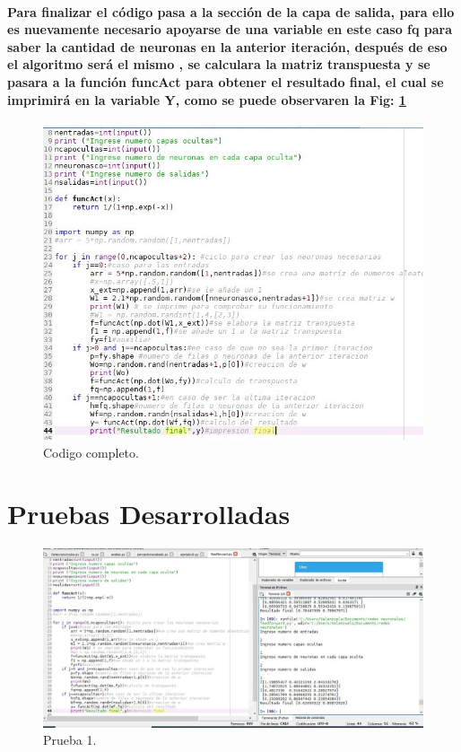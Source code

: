 \documentclass[10pt,a4paper]{article}
\begin{document}
\paragraph{Para finalizar el c\'odigo pasa a la secci\'on de la capa de salida, para ello es nuevamente necesario apoyarse de una variable en este caso fq para saber la cantidad de neuronas en la anterior iteraci\'on, despu\'es de eso el algoritmo ser\'a el mismo , se calculara la matriz transpuesta y se pasara a la funci\'on funcAct para obtener el resultado final, el cual se imprimir\'a en la variable Y, como se puede observaren la Fig: \ref{fig:cod3} }

\begin{figure}[H]
\includegraphics[scale=0.7] {cod3.jpg}
\caption{Codigo completo.}
\label{fig:cod3}
\end{figure}

\section{Pruebas Desarrolladas}

\begin{figure}[H]
\includegraphics[scale=0.4] {p1.jpg}
\caption{Prueba 1.}
\label{fig:p1}
\end{figure}
\end{document}
